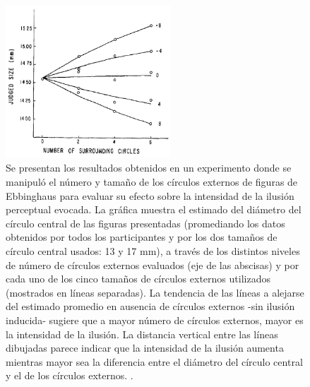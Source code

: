 \begin{figure}[th]
\centering
\includegraphics[width=0.55\textwidth]{Figures/Ebb_Variables} 
\decoRule
\caption[Efecto del Número y Tamaño de los círculos externos en la intensidad de la Ilusión de Ebbinghaus]{Se presentan los resultados obtenidos en un experimento donde se manipuló el número y tamaño de los círculos externos de figuras de Ebbinghaus para evaluar su efecto sobre la intensidad de la ilusión perceptual evocada. La gráfica muestra el estimado del diámetro del círculo central de las figuras presentadas (promediando los datos obtenidos por todos los participantes y por los dos tamaños de círculo central usados: 13 y 17 mm), a través de los distintos niveles de número de círculos externos evaluados (eje de las abscisas) y por cada uno de los cinco tamaños de círculos externos utilizados (mostrados en líneas separadas). La tendencia de las líneas a alejarse del estimado promedio en ausencia de círculos externos -sin ilusión inducida- sugiere que a mayor número de círculos externos, mayor es la intensidad de la ilusión. La distancia vertical entre las líneas dibujadas parece indicar que la intensidad de la ilusión aumenta mientras mayor sea la diferencia entre el diámetro del círculo central y el de los círculos externos. \parencite{Massaro1971}.}
\label{fig:Ebb_Var}
\end{figure}

